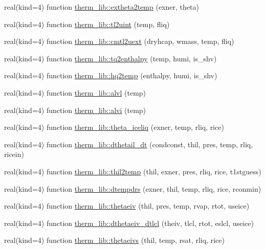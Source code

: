 \begin{DoxyCompactItemize}
\item 
real(kind=4) function \hyperlink{namespacetherm__lib_a04fbafe4252bacbd01867388f45d8104}{therm\+\_\+lib\+::extheta2temp} (exner, theta)
\item 
real(kind=4) function \hyperlink{namespacetherm__lib_a3ad59a4037ed8ed57532b8ea630a7df1}{therm\+\_\+lib\+::tl2uint} (temp, fliq)
\item 
real(kind=4) function \hyperlink{namespacetherm__lib_a2db60e1f300fadcd09ef451059aa571b}{therm\+\_\+lib\+::cmtl2uext} (dryhcap, wmass, temp, fliq)
\item 
real(kind=4) function \hyperlink{namespacetherm__lib_addd05382298a8487d09d7f6e2664dd62}{therm\+\_\+lib\+::tq2enthalpy} (temp, humi, is\+\_\+shv)
\item 
real(kind=4) function \hyperlink{namespacetherm__lib_ad10129810640ad98a16dde22a0c244b8}{therm\+\_\+lib\+::hq2temp} (enthalpy, humi, is\+\_\+shv)
\item 
real(kind=4) function \hyperlink{namespacetherm__lib_a543f4c6ab155d99ad9a5002a8143a654}{therm\+\_\+lib\+::alvl} (temp)
\item 
real(kind=4) function \hyperlink{namespacetherm__lib_a4fbc9bf6cc7bc66ef4c68393149d7288}{therm\+\_\+lib\+::alvi} (temp)
\item 
real(kind=4) function \hyperlink{namespacetherm__lib_a15a79fc7dd2aaabe7bc7da287e531324}{therm\+\_\+lib\+::theta\+\_\+iceliq} (exner, temp, rliq, rice)
\item 
real(kind=4) function \hyperlink{namespacetherm__lib_aece12bd6eb1571019dc09b9968d7e07e}{therm\+\_\+lib\+::dthetail\+\_\+dt} (condconst, thil, pres, temp, rliq, ricein)
\item 
real(kind=4) function \hyperlink{namespacetherm__lib_ac1f38c4afbbc3cf5a540d4e87c8b22c8}{therm\+\_\+lib\+::thil2temp} (thil, exner, pres, rliq, rice, t1stguess)
\item 
real(kind=4) function \hyperlink{namespacetherm__lib_a98f9f548762461093dfbe7604fcc5601}{therm\+\_\+lib\+::dtempdrs} (exner, thil, temp, rliq, rice, rconmin)
\item 
real(kind=4) function \hyperlink{namespacetherm__lib_a2523d158beee975faaed4552724aae65}{therm\+\_\+lib\+::thetaeiv} (thil, pres, temp, rvap, rtot, useice)
\item 
real(kind=4) function \hyperlink{namespacetherm__lib_a46f478124e2b8b34a4f64e13df4a9713}{therm\+\_\+lib\+::dthetaeiv\+\_\+dtlcl} (theiv, tlcl, rtot, eslcl, useice)
\item 
real(kind=4) function \hyperlink{namespacetherm__lib_a59bae4be9ba9f862c7b58953f37a9be2}{therm\+\_\+lib\+::thetaeivs} (thil, temp, rsat, rliq, rice)

\end{DoxyCompactItemize}
